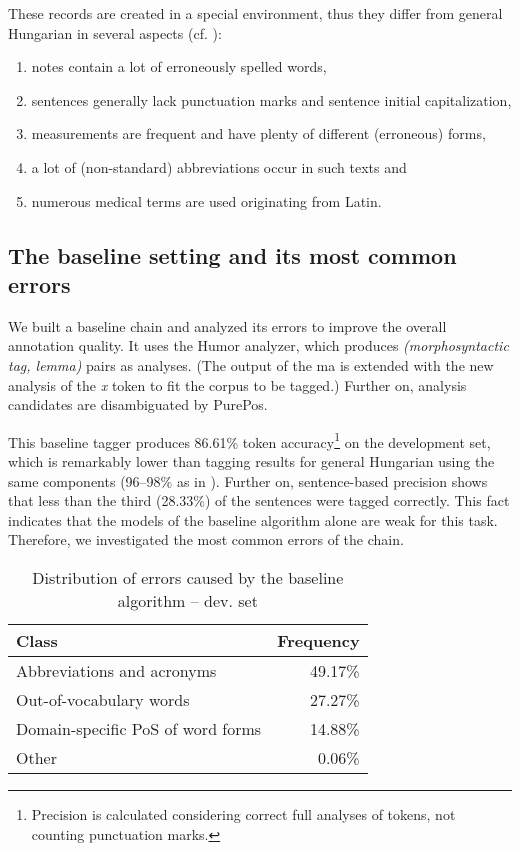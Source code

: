 These records are created in a special environment, thus they differ from general Hungarian in several aspects (cf. \cite{Orosz2013a,Siklosi2013b,Siklosi2012}):

\begin{enumerate} %
 \item notes contain a lot of erroneously spelled words,
 \item sentences generally lack punctuation marks and sentence initial capitalization, 
 \item measurements are frequent and have plenty of different (erroneous) forms,
 \item a lot of (non-standard) abbreviations occur in such texts and
 \item numerous medical terms are used originating from Latin.
\end{enumerate}

\subsection{The baseline setting and its most common errors}
\label{sec:baseline}

We built a baseline chain and analyzed its errors to improve the overall annotation quality.
It uses the Humor analyzer, which produces \emph{(morphosyntactic tag, lemma)} pairs as analyses. 
(The output of the \acrshort{ma} is extended with the new analysis of the \textit{x} token to fit the corpus to be tagged.)
Further on, analysis candidates are disambiguated by PurePos. 

This baseline tagger produces 86.61\% token accuracy\footnote{Precision is calculated considering correct full analyses of tokens, not counting punctuation marks.} on the development set, which is remarkably lower than tagging results for general Hungarian using the same components (96--98\% as in \cite{Orosz2013b,zsibrata2013magyarlanc}). 
Further on, sentence-based precision shows that less than the third (28.33\%) of the sentences were tagged correctly. 
This fact indicates that the models of the baseline algorithm alone are weak for this task. 
Therefore, we investigated the most common errors of the chain.

\begin{table}[H]
\centering
\caption{Distribution of errors caused by the baseline algorithm -- dev. set}
\label{tab:error_types}
\begin{tabular}{ l r } 
\hline
Class & Frequency  \\
\hline
Abbreviations and acronyms & 49.17\% \\
Out-of-vocabulary words & 27.27\% \\
Domain-specific PoS of word forms & 14.88\% \\
Other & 0.06\% \\
\hline
\end{tabular}
\end{table}

